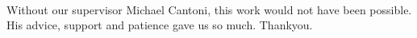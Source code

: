 
\\ \noindent Without our supervisor Michael Cantoni, this work would not have been possible. His advice, support and patience gave us so much. Thankyou. 